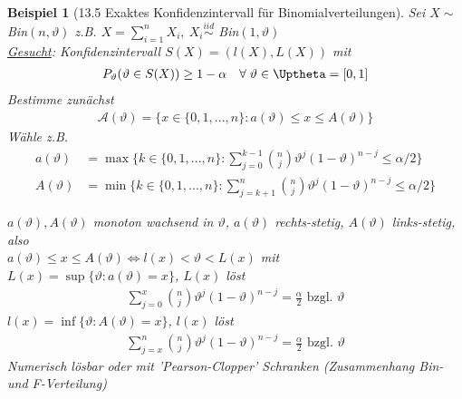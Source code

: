 \documentclass[a4paper,openany]{book}
\theoremstyle{mytheoremstyle}
\newtheorem*{bei}{Beispiel}
\theoremstyle{mytheoremstyle2}
\begin{document}
\begin{bei}[13.5 Exaktes Konfidenzintervall für Binomialverteilungen]
  Sei $X\sim$ Bin$(n,\vartheta )$ z.B. $X=\sum_{i=1}^{n}{X_i},\  X_i \overset{iid}\sim$ Bin$(1,\vartheta )$  \\
  \underline{Gesucht}: Konfidenzintervall $S(X)=(l(X),L(X))$ mit 
  \begin{align*}
    P _{\vartheta }(\vartheta \in S(X))\geq 1-\alpha \quad \forall\;\vartheta \in \Uptheta=[0,1]
  \end{align*}
  Bestimme zunächst 
  \begin{align*}
    \mathcal{A}(\vartheta )=\{x \in \{0,1,...,n\}:a(\vartheta )\leq x \leq A(\vartheta )\}
  \end{align*}
  Wähle z.B. 
  \begin{align*}
    a(\vartheta )&=\max \bigg\{k \in \{0,1,...,n\}:\sum_{j=0}^{k-1}{\binom{n}{j}\vartheta ^j(1-\vartheta )^{n-j}}\leq \alpha /2\bigg\}\\
    A(\vartheta )&=\min \bigg\{k \in \{0,1,...,n\}:\sum_{j=k+1}^{n}{\binom{n}{j}\vartheta ^j(1-\vartheta )^{n-j}}\leq \alpha /2\bigg\}
  \end{align*}
  \begin{center}
  \end{center}
  $a(\vartheta ),A(\vartheta )$ monoton wachsend in $\vartheta $, $a(\vartheta )$ rechts-stetig, $A(\vartheta )$ links-stetig, also \\
  $a(\vartheta )\leq x \leq A(\vartheta ) \Leftrightarrow l(x)<\vartheta <L(x)$ mit \\
  $L(x)=\sup \{\vartheta :a(\vartheta )=x\}$, $L(x)$ löst
  \begin{align*}
    \sum_{j=0}^{x}{\binom{n}{j}\vartheta ^j(1-\vartheta )^{n-j}}=\frac{\alpha }{2}\text{ bzgl. }\vartheta 
  \end{align*}
  $l(x)=\inf \{\vartheta :A(\vartheta )=x\}$, $l(x)$ löst
  \begin{align*}
    \sum_{j=x}^{n}{\binom{n}{j}\vartheta ^j(1-\vartheta )^{n-j}}=\frac{\alpha }{2}\text{ bzgl. }\vartheta 
  \end{align*}
  Numerisch lösbar oder mit 'Pearson-Clopper' Schranken (Zusammenhang Bin- und F-Verteilung)
\end{bei}
\end{document}
